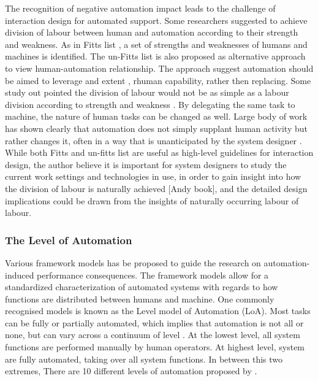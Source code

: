 The recognition of negative automation impact leads to the challenge of interaction design for automated support.  Some researchers suggested to achieve division of labour between human and automation according to their strength and weakness. As in Fitts list \cite{Fitts} , a set of strengths and weaknesses of humans and machines is identified. The un-Fitts list \cite{Hoffman2002} is also proposed as alternative approach to view human-automation relationship. The approach suggest automation should be aimed to leverage and extent , rhuman capability, rather then replacing. Some study out pointed the division of labour would not be as simple as a labour division according to strength and weakness \cite{Bradshaw2011}. By delegating the same task to machine, the nature of human tasks can be changed as well. Large body of work has shown clearly that automation does not simply supplant human activity but rather changes it, often in a way that is unanticipated by the system designer \cite{Bradshaw2011}. While both Fitts and un-fitts list are useful as high-level guidelines for interaction design, the author believe it is important for system designers to study the current work settings and technologies in use, in order to gain insight into how the division of labour is naturally achieved [Andy book], and the detailed design implications could be drawn from the insights of naturally occurring labour of labour. \\


\subsubsection{The Level of Automation}
Various framework models has be proposed to guide the research on automation-induced performance consequences. The framework models allow for a standardized characterization of automated systems with regards to how functions are distributed between humans and machine. One commonly recognised models is known as the Level model of Automation (LoA). Most tasks can be fully or partially automated, which implies that automation is not all or none, but can vary across a continuum of level \cite{Wickens2010}. At the lowest level, all system functions are performed manually by human operators.  At highest level, system are fully automated, taking over all system functions. In between this two extremes, There are 10 different levels of automation proposed by \cite{Wickens2010}. \\

